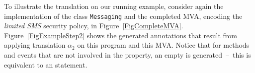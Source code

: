 
To illustrate the translation on our running example, consider again
the implementation of the class \texttt{Messaging} and the completed
MVA, encoding the \emph{limited SMS} security policy, in
Figure~\ref{FigCompleteMVA}. Figure~\ref{FigExampleStep2} shows the
generated annotations that result from applying translation
\(\alpha_2\) on this program and this MVA. Notice that for methods
and events that are not involved in the property, an empty \CaseJML is
generated~--~this is equivalent to an \Skip statement.

